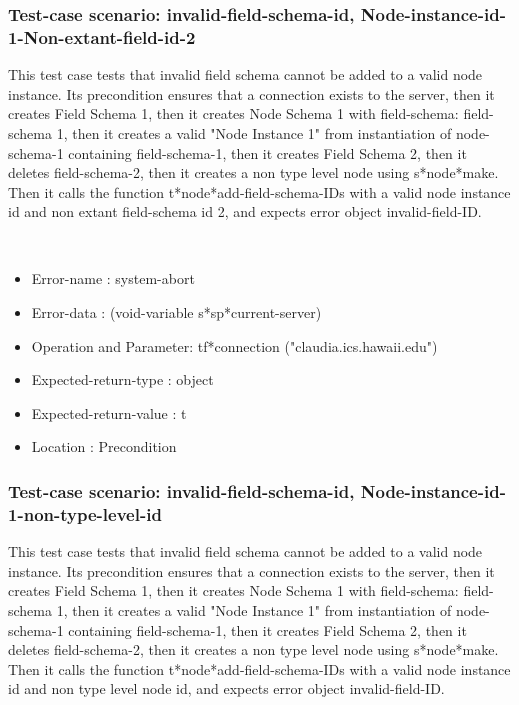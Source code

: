 \subsubsection {Test-case scenario: invalid-field-schema-id, Node-instance-id-1-Non-extant-field-id-2}


This test case tests that invalid field schema cannot be added to a valid node instance.
Its precondition ensures that a connection exists to the server, then it creates Field Schema 1, then it creates Node Schema 1 with field-schema: field-schema 1, then it creates a valid "Node Instance 1" from instantiation of node-schema-1 containing field-schema-1, then it creates Field Schema 2, then it deletes field-schema-2, then it creates a non type level node using s*node*make.
Then it calls the function t*node*add-field-schema-IDs  with a valid node instance id and non extant field-schema id 2, and expects error object invalid-field-ID.



\
\begin {itemize}
\item 	Error-name             : system-abort
\item Error-data             : (void-variable s*sp*current-server)
\item Operation and Parameter: tf*connection ("claudia.ics.hawaii.edu")
\item Expected-return-type   : object
\item Expected-return-value  : t
\item Location               : Precondition



\end {itemize}
\subsubsection {Test-case scenario: invalid-field-schema-id, Node-instance-id-1-non-type-level-id}


This test case tests that invalid field schema cannot be added to a valid node instance.
Its precondition ensures that a connection exists to the server, then it creates Field Schema 1, then it creates Node Schema 1 with field-schema: field-schema 1, then it creates a valid "Node Instance 1" from instantiation of node-schema-1 containing field-schema-1, then it creates Field Schema 2, then it deletes field-schema-2, then it creates a non type level node using s*node*make.
Then it calls the function t*node*add-field-schema-IDs  with a valid node instance id and non type level node id, and expects error object invalid-field-ID.



